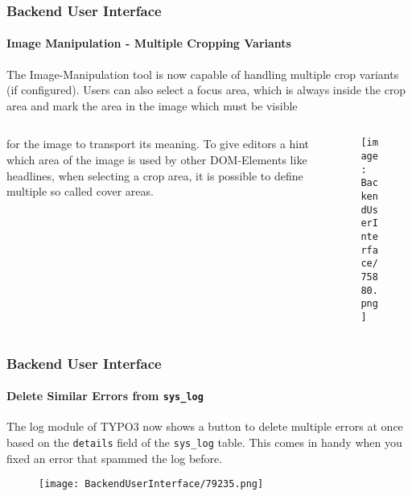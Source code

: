 \begin{frame}[fragile]
	\frametitle{Backend User Interface}
	\framesubtitle{Image Manipulation - Multiple Cropping Variants}

	The Image-Manipulation tool is now capable of handling multiple crop variants (if configured).
	Users can also select a focus area, which is always inside the crop area and mark the area
	in the image which must be visible %

	\begin{columns}[T]
		\begin{column}{.35\textwidth}
			for the image to transport its meaning.
			To give editors a hint which area of the image is used by other DOM-Elements like headlines,
			when selecting a crop area, it is possible to define multiple so called cover areas.
		\end{column}

		\begin{column}{.65\textwidth}
			\begin{figure}\vspace*{-0.6cm}
				\texttt{[image: BackendUserInterface/75880.png]}
			\end{figure}
		\end{column}
	\end{columns}

\end{frame}

\begin{frame}[fragile]
	\frametitle{Backend User Interface}
	\framesubtitle{Delete Similar Errors from \texttt{sys\_log}}

	The log module of TYPO3 now shows a button to delete multiple errors at once based on the
	\texttt{details} field of the \texttt{sys\_log} table. This comes in handy when you fixed
	an error that spammed the log before.

	\begin{figure}\vspace{-0.2cm}
		\texttt{[image: BackendUserInterface/79235.png]}
	\end{figure}

\end{frame}

